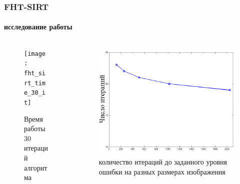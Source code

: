 \begin{frame}
\frametitle{FHT-SIRT}
\framesubtitle{исследование работы}

\begin{columns}[T,onlytextwidth]
  \hspace*{-0.5cm}
  \begin{column}{0.53\textwidth}
    \begin{figure}
      \centering
      \texttt{[image: fht\_sirt\_time\_30\_it]}
      \caption{Время работы 30 итераций алгоритма}
    \end{figure}
  \end{column}
  \begin{column}{0.6\textwidth}
    \begin{figure}
      \centering
      \includegraphics[width=\textwidth]{../Dissertation/images/part1_img/it_till_stop}
      \caption{количество итераций до заданного уровня ошибки на разных размерах изображения}
    \end{figure}
  \end{column}
\end{columns}
\end{frame}


